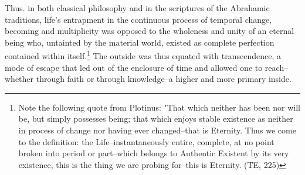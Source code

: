 Thus. in both classical philosophy and in the scriptures of the
Abrahamic traditions, life's entrapment in the continuous process of temporal change, becoming and multiplicity was opposed to the wholeness and unity of an eternal being who, untainted by the material world, existed as complete perfection contained within itself.\footnote{Note the following quote from Plotinus: "That which neither has been nor will be, but simply possesses being; that which enjoys stable existence as neither in process of change nor having ever changed--that is Eternity. Thus we come to the definition: the Life--instantaneously entire, complete, at no point broken into period or part--which belongs to Authentic Existent by its very existence, this is the thing we are probing for--this is Eternity. (TE, 225) } The outside was thus equated with transcendence, a mode of escape that led out of the enclosure of time and allowed one to reach--whether through faith or through knowledge--a higher and more primary inside.

